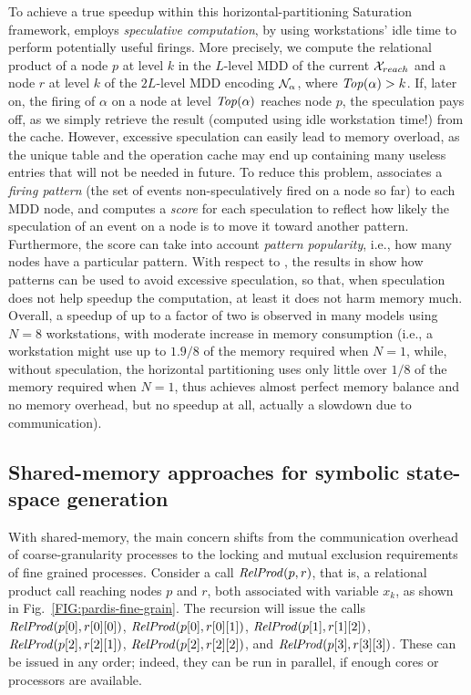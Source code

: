 \documentclass[copyright,creativecommons]{eptcs}
\newcommand{\Top}{\id{Top}} \newcommand{\Bot}{\id{Bot}}
\begin{document}
To achieve a true speedup within this horizontal-partitioning Saturation
framework, \cite{2005PDMC-FirePredict}
employs \emph{speculative computation}, by using workstations' idle time
to perform potentially useful firings.
More precisely, we compute the relational product of a node $p$ at level $k$
in the $L$-level MDD of the current $\mathcal{X}_{reach}$
and a node $r$ at level $k$ of the $2L$-level MDD encoding $\mathcal{N}_{\alpha}$,
where $\Top(\alpha) > k$.
If, later on, the firing of $\alpha$ on a node at level $\Top(\alpha)$
reaches node $p$, the speculation pays off, as we simply retrieve the result
(computed using idle workstation time!) from the cache.
However, excessive speculation can easily lead to memory overload, as the
unique table and the operation cache may end up containing many useless
entries that will not be needed in future.
To reduce this problem, \cite{2006IPDPS-Speculative} associates a
\emph{firing pattern} (the set of events non-speculatively fired on a node
so far) to each MDD node, and computes a \emph{score} for each speculation
to reflect how likely the speculation of an event on a node is to move it toward
another pattern.
Furthermore, the score can take into account \emph{pattern popularity},
i.e., how many nodes have a particular pattern.
With respect to \cite{2005PDMC-FirePredict}, the results in
\cite{2006IPDPS-Speculative} show how patterns can be used to avoid excessive
speculation, so that, when speculation does not help speedup the computation,
at least it does not harm memory much.
Overall, a speedup of up to a factor of two is observed in many models
using $N = 8$ workstations, with moderate increase in memory consumption
(i.e., a workstation might use up to $1.9/8$ of the memory required
when $N = 1$, while, without speculation, the horizontal partitioning
uses only little over $1/8$ of the memory required when $N = 1$, thus
achieves almost perfect memory balance and no memory overhead, but no speedup
at all, actually a slowdown due to communication).


\subsection{Shared-memory approaches for symbolic state-space generation}

With shared-memory, the main concern shifts from the
communication overhead of coarse-granularity processes to
the locking and mutual exclusion requirements of fine grained processes.
Consider a call $\mathit{RelProd}(p,r)$, that is, a relational product call
reaching nodes $p$ and $r$, both associated with variable $x_k$, as shown in
Fig.~\ref{FIG:pardis-fine-grain}.
The recursion will issue the calls
$\mathit{RelProd}(p[0],r[0][0])$,
$\mathit{RelProd}(p[0],r[0][1])$,
$\mathit{RelProd}(p[1],r[1][2])$,
$\mathit{RelProd}(p[2],r[2][1])$,
$\mathit{RelProd}(p[2],r[2][2])$, and
$\mathit{RelProd}(p[3],r[3][3])$.
These can be issued in any order;
indeed, they can be run in parallel, if enough cores or processors
are available.
\end{document}
